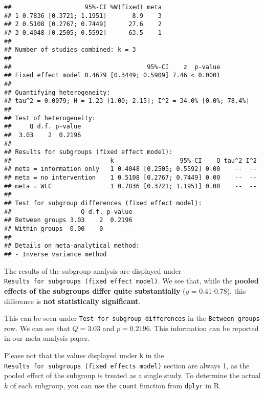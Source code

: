 \documentclass[]{book}
\newenvironment{Shaded}{\begin{snugshade}}{\end{snugshade}}
\newcommand{\KeywordTok}[1]{\textcolor[rgb]{0.13,0.29,0.53}{\textbf{#1}}}
\newcommand{\DataTypeTok}[1]{\textcolor[rgb]{0.13,0.29,0.53}{#1}}
\newcommand{\OperatorTok}[1]{\textcolor[rgb]{0.81,0.36,0.00}{\textbf{#1}}}
\newcommand{\NormalTok}[1]{#1}
\theoremstyle{definition}
\theoremstyle{definition}
\theoremstyle{definition}
\theoremstyle{remark}
\begin{document}
\begin{verbatim}
##                    95%-CI %W(fixed) meta
## 1 0.7836 [0.3721; 1.1951]       8.9    3
## 2 0.5108 [0.2767; 0.7449]      27.6    2
## 3 0.4048 [0.2505; 0.5592]      63.5    1
## 
## Number of studies combined: k = 3
## 
##                                     95%-CI    z  p-value
## Fixed effect model 0.4679 [0.3449; 0.5909] 7.46 < 0.0001
## 
## Quantifying heterogeneity:
## tau^2 = 0.0079; H = 1.23 [1.00; 2.15]; I^2 = 34.0% [0.0%; 78.4%]
## 
## Test of heterogeneity:
##     Q d.f. p-value
##  3.03    2  0.2196
## 
## Results for subgroups (fixed effect model):
##                           k                  95%-CI    Q tau^2 I^2
## meta = information only   1 0.4048 [0.2505; 0.5592] 0.00    --  --
## meta = no intervention    1 0.5108 [0.2767; 0.7449] 0.00    --  --
## meta = WLC                1 0.7836 [0.3721; 1.1951] 0.00    --  --
## 
## Test for subgroup differences (fixed effect model):
##                   Q d.f. p-value
## Between groups 3.03    2  0.2196
## Within groups  0.00    0      --
## 
## Details on meta-analytical method:
## - Inverse variance method
\end{verbatim}

The results of the subgroup analysis are displayed under
\texttt{Results\ for\ subgroups\ (fixed\ effect\ model)}. We see that,
while the \textbf{pooled effects of the subgroups differ quite
substantially} (\emph{g} = 0.41-0.78), this difference is \textbf{not
statistically significant}.

This can be seen under \texttt{Test\ for\ subgroup\ differences} in the
\texttt{Between\ groups} row. We can see that \(Q=3.03\) and
\(p=0.2196\). This information can be reported in our meta-analysis
paper.

\begin{rmdachtung}
Please not that the values displayed under \texttt{k} in the
\texttt{Results\ for\ subgroups\ (fixed\ effects\ model)} section are
always 1, as the pooled effect of the subgroup is treated as a single
study. To determine the actual \(k\) of each subgroup, you can use the
\texttt{count} function from \texttt{dplyr} in R.
\end{rmdachtung}

\begin{Shaded}
\end{Shaded}
\end{document}
